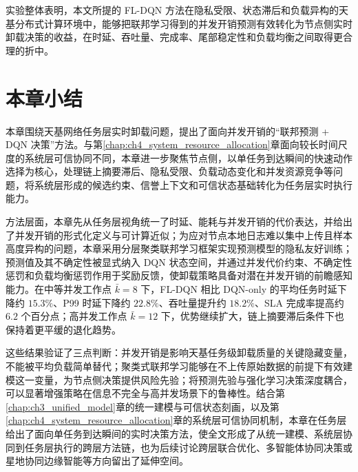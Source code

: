 实验整体表明，本文所提的 FL-DQN 方法在隐私受限、状态滞后和负载异构的天基分布式计算环境中，能够把联邦学习得到的并发开销预测有效转化为节点侧实时卸载决策的收益，在时延、吞吐量、完成率、尾部稳定性和负载均衡之间取得更合理的折中。

\section{本章小结}
\label{sec:ch5_conclusion}

本章围绕天基网络任务层实时卸载问题，提出了面向并发开销的“联邦预测 + DQN 决策”方法。与第\ref{chap:ch4_system_resource_allocation}章面向较长时间尺度的系统层可信协同不同，本章进一步聚焦节点侧，以单任务到达瞬间的快速动作选择为核心，处理链上摘要滞后、隐私受限、负载动态变化和并发资源竞争等问题，将系统层形成的候选约束、信誉上下文和可信状态基础转化为任务层实时执行能力。

方法层面，本章先从任务层视角统一了时延、能耗与并发开销的代价表达，并给出了并发开销的形式化定义与可计算近似；为应对节点本地日志难以集中上传且样本高度异构的问题，本章采用分层聚类联邦学习框架实现预测模型的隐私友好训练；预测值及其不确定性被显式纳入 DQN 状态空间，并通过并发代价约束、不确定性惩罚和负载均衡惩罚作用于奖励反馈，使卸载策略具备对潜在并发开销的前瞻感知能力。在中等并发工作点 $\bar{k}=8$ 下，FL-DQN 相比 DQN-only 的平均任务时延下降约 $15.3\%$、P99 时延下降约 $22.8\%$、吞吐量提升约 $18.2\%$、SLA 完成率提高约 $6.2$ 个百分点；高并发工作点 $\bar{k}=12$ 下，优势继续扩大，链上摘要滞后条件下也保持着更平缓的退化趋势。

这些结果验证了三点判断：并发开销是影响天基任务级卸载质量的关键隐藏变量，不能被平均负载简单替代；聚类式联邦学习能够在不上传原始数据的前提下有效建模这一变量，为节点侧决策提供风险先验；将预测先验与强化学习决策深度耦合，可以显著增强策略在信息不完全与高并发场景下的鲁棒性。结合第\ref{chap:ch3_unified_model}章的统一建模与可信状态刻画，以及第\ref{chap:ch4_system_resource_allocation}章的系统层可信协同机制，本章在任务层给出了面向单任务到达瞬间的实时决策方法，使全文形成了从统一建模、系统层协同到任务层执行的跨层方法链，也为后续讨论跨层联合优化、多智能体协同决策或星地协同边缘智能等方向留出了延伸空间。


